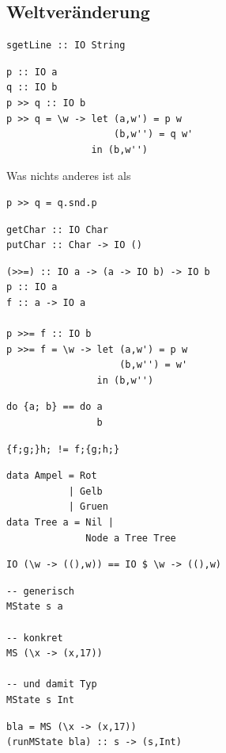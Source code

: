 	\subsection{Weltveränderung} %
	\label{sub:weltveraenderung}
		\lstHaskell
		\begin{lstlisting}[morekeywords={sgetLine}]
sgetLine :: IO String
		\end{lstlisting}
		\lstHaskell
		\begin{lstlisting}
p :: IO a
q :: IO b
p >> q :: IO b
p >> q = \w -> let (a,w') = p w
                   (b,w'') = q w'
               in (b,w'')
		\end{lstlisting}
		Was nichts anderes ist als
		\lstHaskell
		\begin{lstlisting}
p >> q = q.snd.p
		\end{lstlisting}
		\lstHaskell
		\begin{lstlisting}
getChar :: IO Char
putChar :: Char -> IO ()
		\end{lstlisting}
		\lstHaskell
		\begin{lstlisting}
(>>=) :: IO a -> (a -> IO b) -> IO b
p :: IO a
f :: a -> IO a

p >>= f :: IO b
p >>= f = \w -> let (a,w') = p w
                    (b,w'') = w'
                in (b,w'')
		\end{lstlisting}
		\lstHaskell
		\begin{lstlisting}
do {a; b} == do a
                b
		\end{lstlisting}
		\lstHaskell
		\begin{lstlisting}
{f;g;}h; != f;{g;h;}
		\end{lstlisting}
		\lstHaskell
		\begin{lstlisting}
data Ampel = Rot
           | Gelb
           | Gruen
data Tree a = Nil |
              Node a Tree Tree
		\end{lstlisting}
		\lstHaskell
		\begin{lstlisting}
IO (\w -> ((),w)) == IO $ \w -> ((),w)
		\end{lstlisting}


		\lstHaskell
		\begin{lstlisting}
-- generisch
MState s a

-- konkret
MS (\x -> (x,17))

-- und damit Typ
MState s Int
		\end{lstlisting}

		\lstHaskell
		\begin{lstlisting}
bla = MS (\x -> (x,17))
(runMState bla) :: s -> (s,Int)
		\end{lstlisting}

